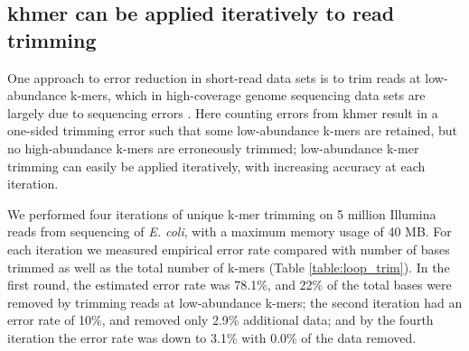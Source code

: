 \documentclass{article}
\begin{document}
\subsection{khmer can be applied iteratively to read trimming}

One approach to error reduction in short-read data sets is to trim
reads at low-abundance k-mers, which in high-coverage genome
sequencing data sets are largely due to sequencing errors \cite{Kelley2010}.
Here counting errors from khmer result in a one-sided trimming
error such that some low-abundance k-mers are retained, but no
high-abundance k-mers are erroneously trimmed; low-abundance k-mer
trimming can easily be applied iteratively, with increasing accuracy
at each iteration.

We performed four iterations of unique k-mer trimming on 5 million
Illumina reads from sequencing of {\em E. coli}, with a maximum memory
usage of 40 MB.  For each iteration we measured empirical error rate
compared with number of bases trimmed as well as the total number of
k-mers
(Table \ref{table:loop_trim}).
In the first round, the estimated error
rate was 78.1\%, and 22\% of the total bases were removed by trimming
reads at low-abundance k-mers; the second iteration had an error
rate of 10\%, and removed only 2.9\% additional data; and by
the fourth iteration the error rate was down to 3.1\% with 0.0\% of the data removed.

\begin{table}[ht]
\caption{Iterative low-memory k-mer trimming.  The results of trimming
  reads at unique (erroneous) k-mers from a 165 Mbp short-read data
  set in under 40 MB of RAM.  After each iteration, we measured the
  total number of distinct k-mers in the data set, the total number
  of unique (and likely erroneous) k-mers remaining, and the
  number of unique k-mers present at the 3' end of reads.}

\label{table:loop_trim}

\end{table}
\end{document}
